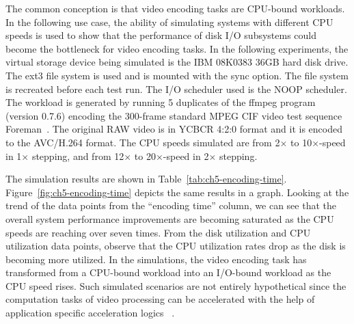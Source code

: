 The common conception is that video encoding tasks are CPU-bound workloads. In the following use case, the ability of simulating systems with different CPU speeds is used to show that the performance of disk I/O subsystems could become the bottleneck for video encoding tasks. In the following experiments, the virtual storage device being simulated is the IBM 08K0383 36GB hard disk drive. The ext3 file system is used and is mounted with the sync option. The file system is recreated before each test run. The I/O scheduler used is the NOOP scheduler. The workload is generated by running 5 duplicates of the ffmpeg program (version 0.7.6) encoding the 300-frame standard MPEG CIF video test sequence Foreman~\cite{FFmpeg:2013}. The original RAW video is in YCBCR 4:2:0 format and it is encoded to the AVC/H.264 format. The CPU speeds simulated are from 2$\times$ to 10$\times$-speed in 1$\times$ stepping, and from 12$\times$ to 20$\times$-speed in 2$\times$ stepping.

The simulation results are shown in Table~\ref{tab:ch5-encoding-time}. Figure~\ref{fig:ch5-encoding-time} depicts the same results in a graph. Looking at the trend of the data points from the ``encoding time'' column, we can see that the overall system performance improvements are becoming saturated as the CPU speeds are reaching over seven times. From the disk utilization and CPU utilization data points, observe that the CPU utilization rates drop as the disk is becoming more utilized. In the simulations, the video encoding task has transformed from a CPU-bound workload into an I/O-bound workload as the CPU speed rises. Such simulated scenarios are not entirely hypothetical since the computation tasks of video processing can be accelerated with the help of application specific acceleration logics~\cite{Wu:2009} \cite{Wu:2015:ASAP}.


